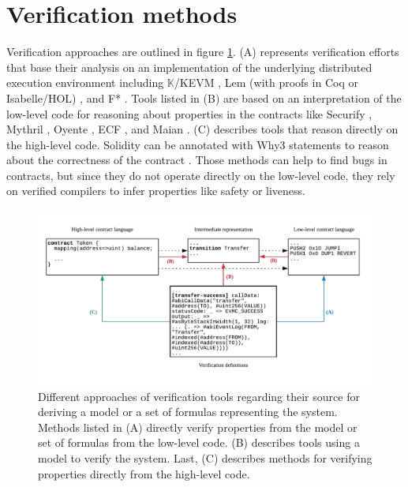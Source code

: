 \section{Verification methods}
\label{verification}

Verification approaches are outlined in figure \ref{fig:verification}. 
(A) represents verification efforts that base their analysis on an implementation of the underlying distributed execution environment including $\mathbb{K}$/KEVM \cite{Hildenbrandt2017}, Lem (with proofs in Coq or Isabelle/HOL) \cite{Hirai2017}, and F* \cite{Bhargavan2016,Grishchenko2018}.
Tools listed in (B) are based on an interpretation of the low-level code for reasoning about properties in the contracts like Securify \cite{Tsankov2017}, Mythril \cite{Mueller2018}, Oyente \cite{Luu2016,Albert2018}, ECF \cite{Grossman2017}, and Maian \cite{Nikolic2018}. 
(C) describes tools that reason directly on the high-level code. Solidity can be annotated with Why3 statements to reason about the correctness of the contract \cite{Reitwiessner2015Why3}. %
Those methods can help to find bugs in contracts, but since they do not operate directly on the low-level code, they rely on verified compilers to infer properties like safety or liveness.


\begin{figure}
\includegraphics[width=\textwidth]{fig/Verification.pdf}
\caption{Different approaches of verification tools regarding their source for deriving a model or a set of formulas representing the system. Methods listed in (A) directly verify properties from the model or set of formulas from the low-level code. (B) describes tools using a model to verify the system. Last, (C) describes methods for verifying properties directly from the high-level code.}
\label{fig:verification}
\end{figure}


